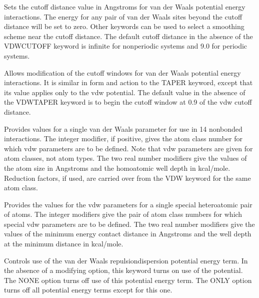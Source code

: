 \documentclass[letterpaper,11pt,english]{sphinxmanual}
\begin{document}

  Sets the cutoff distance value in Angstroms for van der Waals potential energy interactions. The energy for any pair of van der Waals sites beyond the cutoff distance will be set to zero. Other keywords can be used to select a smoothing scheme near the cutoff distance. The default cutoff distance in the absence of the VDW\sphinxhyphen{}CUTOFF keyword is infinite for nonperiodic systems and 9.0 for periodic systems.



  Allows modification of the cutoff windows for van der Waals potential energy interactions. It is similar in form and action to the TAPER keyword, except that its value applies only to the vdw potential. The default value in the absence of the VDW\sphinxhyphen{}TAPER keyword is to begin the cutoff window at 0.9 of the vdw cutoff distance.

  Provides values for a single van der Waals parameter for use in 1\sphinxhyphen{}4 nonbonded interactions. The integer modifier, if positive, gives the atom class number for which vdw parameters are to be defined. Note that vdw parameters are given for atom classes, not atom types. The two real number modifiers give the values of the atom size in Angstroms and the homoatomic well depth in kcal/mole. Reduction factors, if used, are carried over from the VDW keyword for the same atom class.


  Provides the values for the vdw parameters for a single special heteroatomic pair of atoms. The integer modifiers give the pair of atom class numbers for which special vdw parameters are to be defined. The two real number modifiers give the values of the minimum energy contact distance in Angstroms and the well depth at the minimum distance in kcal/mole.

  Controls use of the van der Waals repulsion\sphinxhyphen{}dispersion potential energy term. In the absence of a modifying option, this keyword turns on use of the potential. The NONE option turns off use of this potential energy term. The ONLY option turns off all potential energy terms except for this one.
\end{document}
